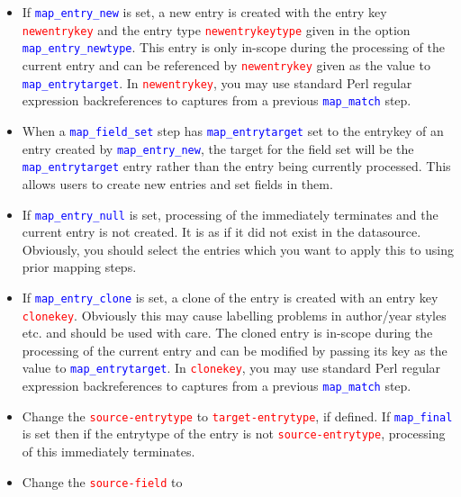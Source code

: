 \documentclass{ltxdockit}
\begin{document}
\begin{itemize}
\item If \textcolor{blue}{\texttt{map\_entry\_new}} is set, a new entry is
  created with the entry key \textcolor{red}{\texttt{newentrykey}} and the
  entry type \textcolor{red}{\texttt{newentrykeytype}} given in the option
  \textcolor{blue}{\texttt{map\_entry\_newtype}}. This entry is only
  in-scope during the processing of the current entry and can be referenced
  by \textcolor{red}{\texttt{newentrykey}} given as the value to
  \textcolor{blue}{\texttt{map\_entrytarget}}. In
  \textcolor{red}{\texttt{newentrykey}}, you may use standard Perl
  regular expression backreferences to captures from a
  previous \textcolor{blue}{\texttt{map\_match}} step.
\item When a \textcolor{blue}{\texttt{map\_field\_set}} step has
  \textcolor{blue}{\texttt{map\_entrytarget}} set to the entrykey of an
  entry created by \textcolor{blue}{\texttt{map\_entry\_new}}, the target
  for the field set will be the \textcolor{blue}{\texttt{map\_entrytarget}}
  entry rather than the entry being currently processed. This allows users
  to create new entries and set fields in them.
\item If \textcolor{blue}{\texttt{map\_entry\_null}} is set,
  processing of the  immediately terminates and the current
  entry is not created. It is as if it did not exist in the
  datasource. Obviously, you should select the entries which you want
  to apply this to using prior mapping steps.
\item If \textcolor{blue}{\texttt{map\_entry\_clone}} is set, a clone of
  the entry is created with an entry key
  \textcolor{red}{\texttt{clonekey}}. Obviously this may cause labelling
  problems in author/year styles etc. and should be used with care. The
  cloned entry is in-scope during the processing of the current entry and
  can be modified by passing its key as the value to
  \textcolor{blue}{\texttt{map\_entrytarget}}. In
  \textcolor{red}{\texttt{clonekey}}, you may use standard Perl
  regular expression backreferences to captures from a
  previous \textcolor{blue}{\texttt{map\_match}} step.
\item Change the \textcolor{red}{\texttt{source-entrytype}} to
  \textcolor{red}{\texttt{target-entrytype}}, if defined. If
  \textcolor{blue}{\texttt{map\_final}} is set then if the entrytype of the
  entry is not \textcolor{red}{\texttt{source-entrytype}}, processing of
  this  immediately terminates.
\item Change the \textcolor{red}{\texttt{source-field}} to

\end{itemize}
\end{document}

